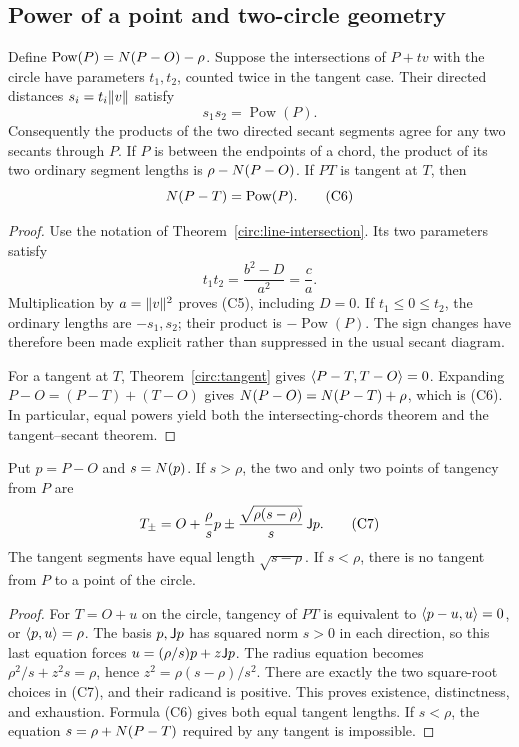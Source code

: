 \subsection{Power of a point and two-circle geometry}

\begin{theorem}
\label{circ:power}
Define $\operatorname{Pow}(P)=N(P-O)-\rho$.
Suppose the intersections of $P+tv$ with the circle have parameters
$t_1,t_2$, counted twice in the tangent case.  Their directed distances
$s_i=t_i\lVert v\rVert$ satisfy
\[
 s_1s_2=\operatorname{Pow}(P).                       \tag{C5}
\]
Consequently the products of the two directed secant segments agree for
any two secants through $P$.  If $P$ is between the endpoints of a chord,
the product of its two ordinary segment lengths is
$\rho-N(P-O)$.  If $PT$ is tangent at $T$, then
\[
 N(P-T)=\operatorname{Pow}(P).                 \tag{C6}
\]
\end{theorem}
\begin{proof}
Use the notation of Theorem~\ref{circ:line-intersection}.  Its two
parameters satisfy
\[
 t_1t_2=\frac{b^2-D}{a^2}=\frac{c}{a}.
\]
Multiplication by $a=\lVert v\rVert^2$ proves (C5), including $D=0$.
If $t_1\le0\le t_2$, the ordinary lengths are $-s_1,s_2$; their product
is $-\operatorname{Pow}(P)$.  The sign changes have therefore been made
explicit rather than suppressed in the usual secant diagram.

For a tangent at $T$, Theorem~\ref{circ:tangent} gives
$\langle P-T,T-O\rangle=0$.  Expanding
$P-O=(P-T)+(T-O)$ gives
$N(P-O)=N(P-T)+\rho$, which is (C6).
In particular, equal powers yield both the intersecting-chords theorem
and the tangent--secant theorem.
\end{proof}

\begin{theorem}
\label{circ:external-tangents}
Put $p=P-O$ and $s=N(p)$.  If $s>\rho$, the two and only two
points of tangency from $P$ are
\[
 T_\pm=O+\frac{\rho}{s}p
        \mathbin{\pm}\frac{\sqrt{\rho(s-\rho)}}{s}\,\mathsf J p.       \tag{C7}
\]
The tangent segments have equal length $\sqrt{s-\rho}$.
If $s<\rho$, there is no tangent from $P$ to a point of the circle.
\end{theorem}
\begin{proof}
For $T=O+u$ on the circle, tangency of $PT$ is equivalent to
$\langle p-u,u\rangle=0$, or $\langle p,u\rangle=\rho$.
The basis $p,\mathsf J p$ has squared norm $s>0$ in each direction, so this last
equation forces
$u=(\rho/s)p+z\mathsf J p$.  The radius equation becomes
$\rho^2/s+z^2s=\rho$, hence
$z^2=\rho(s-\rho)/s^2$.  There are exactly the two square-root choices in
(C7), and their radicand is positive.  This proves existence, distinctness,
and exhaustion.  Formula (C6) gives both equal tangent lengths.
If $s<\rho$, the equation $s=\rho+N(P-T)$ required by any tangent
is impossible.
\end{proof}

